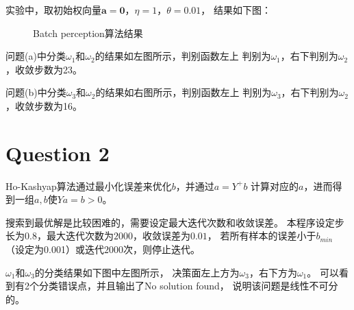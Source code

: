 \documentclass{article}
\newcommand{\question}[1]{\section*{Question #1}}
\begin{document}
实验中，取初始权向量$\pmb{a} = \pmb{0}$，$\eta = 1$，$\theta = 0.01$，
结果如下图：
\begin{figure}[ht]
	\centering
	\centering
	\caption{Batch perception算法结果}
	\label{figl}
\end{figure}

问题(a)中分类$\omega_1$和$\omega_2$的结果如左图所示，判别函数左上
判别为$\omega_1$，右下判别为$\omega_2$，收敛步数为23。

问题(b)中分类$\omega_3$和$\omega_2$的结果如右图所示，判别函数左上
判别为$\omega_3$，右下判别为$\omega_2$，收敛步数为16。

\question{2}
Ho-Kashyap算法通过最小化误差来优化$b$，并通过$a = Y^+ b$
计算对应的$a$，进而得到一组$a, b$使$Ya = b > 0$。 

搜索到最优解是比较困难的，需要设定最大迭代次数和收敛误差。
本程序设定步长为0.8，最大迭代次数为$2000$，收敛误差为$0.01$，
若所有样本的误差小于$b_{min}$（设定为0.001）或迭代$2000$次，则停止迭代。


$\omega_1$和$\omega_3$的分类结果如下图中左图所示，
决策面左上方为$\omega_3$，右下方为$\omega_1$。
可以看到有2个分类错误点，并且输出了No solution found，
说明该问题是线性不可分的。
\end{document}

